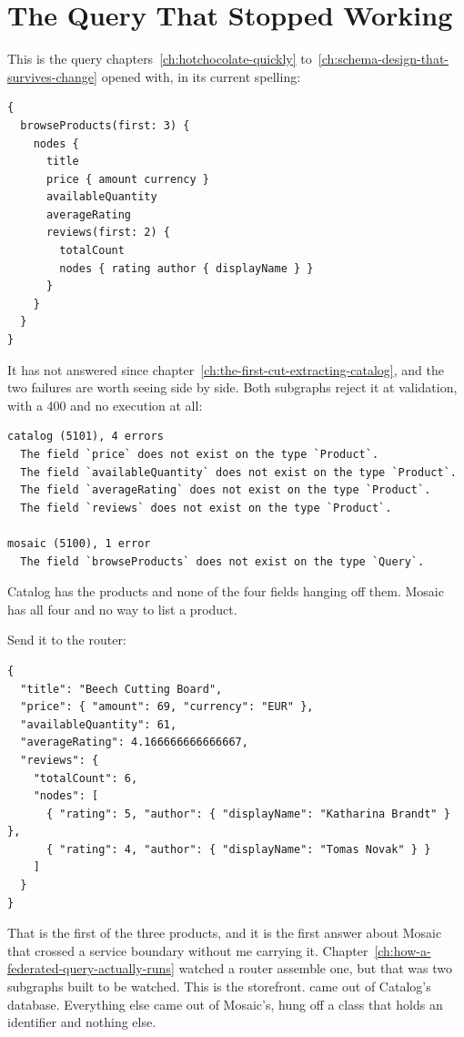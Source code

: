\section{The Query That Stopped Working}
\label{sec:ch10-the-query-that-stopped-working}
%

This is the query chapters~\ref{ch:hotchocolate-quickly}
to~\ref{ch:schema-design-that-survives-change} opened with, in its current
spelling:

\begin{verbatim}
{
  browseProducts(first: 3) {
    nodes {
      title
      price { amount currency }
      availableQuantity
      averageRating
      reviews(first: 2) {
        totalCount
        nodes { rating author { displayName } }
      }
    }
  }
}
\end{verbatim}

It has not answered since
chapter~\ref{ch:the-first-cut-extracting-catalog}, and the two failures are
worth seeing side by side. Both subgraphs reject it at validation, with a 400
and no execution at all:

\begin{verbatim}
catalog (5101), 4 errors
  The field `price` does not exist on the type `Product`.
  The field `availableQuantity` does not exist on the type `Product`.
  The field `averageRating` does not exist on the type `Product`.
  The field `reviews` does not exist on the type `Product`.

mosaic (5100), 1 error
  The field `browseProducts` does not exist on the type `Query`.
\end{verbatim}

Catalog has the products and none of the four fields hanging off them. Mosaic
has all four and no way to list a product.

Send it to the router:

\begin{verbatim}
{
  "title": "Beech Cutting Board",
  "price": { "amount": 69, "currency": "EUR" },
  "availableQuantity": 61,
  "averageRating": 4.166666666666667,
  "reviews": {
    "totalCount": 6,
    "nodes": [
      { "rating": 5, "author": { "displayName": "Katharina Brandt" } },
      { "rating": 4, "author": { "displayName": "Tomas Novak" } }
    ]
  }
}
\end{verbatim}

That is the first of the three products, and it is the first answer about
Mosaic that crossed a service boundary without me carrying it.
Chapter~\ref{ch:how-a-federated-query-actually-runs} watched a router assemble
one, but that was two subgraphs built to be watched. This is the storefront.
 came out of Catalog's database. Everything else came out of
Mosaic's, hung off a  class that holds an identifier and nothing
else.

